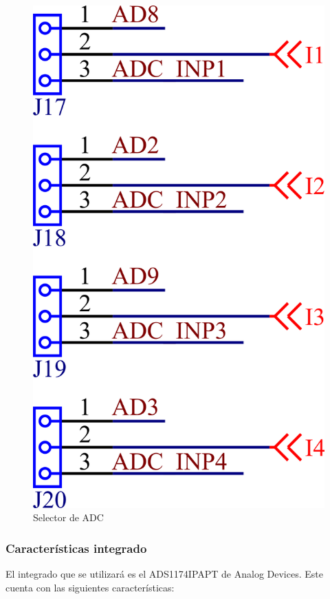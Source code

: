 \documentclass[../et.tex]{subfiles}
\begin{document}
\begin{figure}[!htbp]
  \centering
  \includegraphics[scale=1.5]{../images/adc-source-selector.png}
  \caption{Selector de ADC}
  \label{fig:adc-source-selector}
\end{figure}

\subsubsection{Características integrado}
El integrado que se utilizará es el ADS1174IPAPT de Analog Devices. Este cuenta con las siguientes características:
\end{document}
